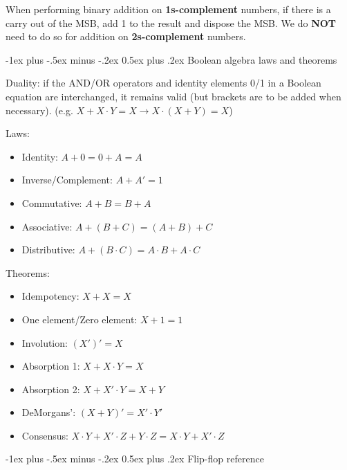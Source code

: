 \documentclass[a4paper]{article}
\makeatletter
\renewcommand{\section}{\@startsection{section}{1}{0mm}%
	{-1ex plus -.5ex minus -.2ex}%
	{0.5ex plus .2ex}%
	{\normalfont\large\bfseries}}
\makeatother
\begin{document}
\begin{justifying}
\begin{multicols}{2}
            When performing binary addition on \textbf{1s-complement} numbers, if there is a carry out of the MSB, add 1 to the result and dispose the MSB. We do \textbf{NOT} need to do so for addition on \textbf{2s-complement} numbers.
                        
            
            \section{Boolean algebra laws and theorems}
            
            Duality: if the AND/OR operators and identity elements 0/1 in a Boolean equation are interchanged, it remains valid (but brackets are to be added when necessary). (e.g. $X + X \cdot Y = X \rightarrow X \cdot (X + Y) = X$)
            
            Laws:
            \begin{itemize}
                \item Identity: $A + 0 = 0 + A = A$
                \item Inverse/Complement: $A + A' = 1$
                \item Commutative: $A + B = B + A$
                \item Associative: $A + (B + C) = (A + B) + C$
                \item Distributive: $A + (B \cdot C) = A \cdot B + A \cdot C$
            \end{itemize}
        
            Theorems:
            \begin{itemize}
                \item Idempotency: $X + X = X$
                \item One element/Zero element: $X + 1 = 1$
                \item Involution: $(X')' = X$
                \item Absorption 1: $X + X \cdot Y = X$
                \item Absorption 2: $X + X' \cdot Y = X + Y$
                \item DeMorgans': $(X + Y)' = X' \cdot Y'$
                \item Consensus: $X \cdot Y + X' \cdot Z + Y \cdot Z = X \cdot Y + X' \cdot Z$
            \end{itemize}
          
          
            \section{Flip-flop reference}
            

\end{multicols}
\end{justifying}
\end{document}
